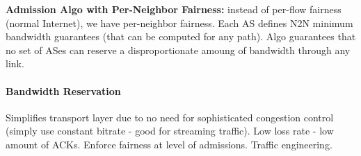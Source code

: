 \textbf{Admission Algo with Per-Neighbor Fairness:} instead of per-flow fairness (normal Internet), we have per-neighbor fairness. Each AS defines N2N minimum bandwidth guarantees (that can be computed for any path). Algo guarantees that no set of ASes can reserve a disproportionate amoung of bandwidth through any link. %

\paragraph{Bandwidth Reservation}
Simplifies transport layer due to no need for sophisticated congestion control (simply use constant bitrate - good for streaming traffic). Low loss rate - low amount of ACKs. Enforce fairness at level of admissions. Traffic engineering.



